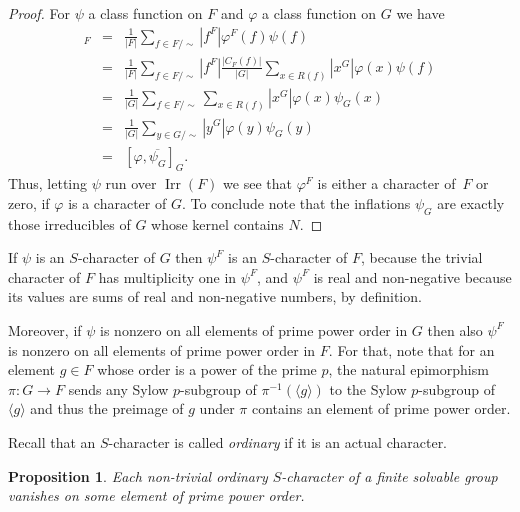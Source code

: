 \documentclass[12pt,leqno,a4paper]{amsart}
\newcommand{\Irr}{{\operatorname{Irr}}}
\let\vhi=\varphi
\newtheorem{prop}[thm]{Proposition}
\theoremstyle{definition}
\begin{document}
\begin{proof}
For $\psi$ a class function on $F$ and $\vhi$ a class function on $G$ we have
\begin{eqnarray*}
  [\vhi^F, \overline{\psi}]_F & = &
  \frac{1}{|F|} \sum_{f \in F/\sim} |f^F| \vhi^F(f) \psi(f) \\
  & = & \frac{1}{|F|} \sum_{f \in F/\sim}
     |f^F| \frac{|C_F(f)|}{|G|} \sum_{x \in R(f)} |x^G| \vhi(x) \psi(f) \\
  & = & \frac{1}{|G|} \sum_{f \in F/\sim} \sum_{x \in R(f)}
     |x^G| \vhi(x) \psi_G(x) \\
  & = & \frac{1}{|G|} \sum_{y \in G/\sim} |y^G| \vhi(y) \psi_G(y) \\
  & = & [\vhi, \overline{\psi_G}]_G.
\end{eqnarray*}
Thus, letting $\psi$ run over $\Irr(F)$ we see that $\vhi^F$ is either a
character of~$F$ or zero, if $\vhi$ is a character of $G$. To conclude note that
the inflations $\psi_G$ are exactly those irreducibles of $G$ whose kernel
contains $N$.
\end{proof}

If $\psi$ is an $S$-character of $G$ then $\psi^F$ is an $S$-character of $F$,
because the trivial character of $F$ has multiplicity one in $\psi^F$, and
$\psi^F$ is real and non-negative because its values are sums of real and
non-negative numbers, by definition.

Moreover, if $\psi$ is nonzero on all elements of prime power order in $G$ then
also $\psi^F$ is nonzero on all elements of prime power order in $F$. For that,
note that for an element $g\in F$ whose order is a power of the prime $p$,
the natural epimorphism $\pi:G\to F$ sends any Sylow $p$-subgroup of
$\pi^{-1}(\langle g\rangle)$ to the Sylow $p$-subgroup of $\langle g\rangle$ and
thus the preimage of $g$ under $\pi$ contains an element of prime power order.

Recall that an $S$-character is called \emph{ordinary} if it is an actual
character.

\begin{prop}\label{prop:solvnotord}
 Each non-trivial ordinary $S$-character of a finite solvable group vanishes on
 some element of prime power order.
\end{prop}
\end{document}
